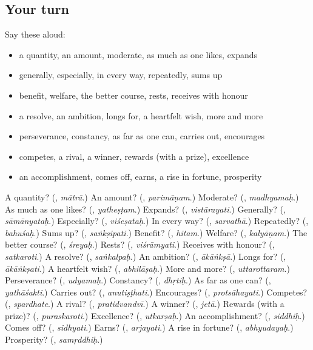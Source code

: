\subsection*{Your turn}
Say these aloud:

\begin{itemize}
\raggedright
  \item a quantity, an amount, moderate, as much as one likes, expands
  \item generally, especially, in every way, repeatedly, sums up
  \item benefit, welfare, the better course, rests, receives with honour
  \item a resolve, an ambition, longs for, a heartfelt wish, more and more
  \item perseverance, constancy, as far as one can, carries out, encourages
  \item competes, a rival, a winner, rewards (with a prize), excellence
  \item an accomplishment, comes off, earns, a rise in fortune, prosperity
\end{itemize}

\begin{tcolorbox}[breakable,colback=teal!4,colframe=teal!35!black,title={Before you move on}]
A quantity? (\textbf{}, \emph{mātrā}.) An amount? (\textbf{}, \emph{parimāṇam}.) Moderate? (\textbf{}, \emph{madhyamaḥ}.) As much as one likes? (\textbf{}, \emph{yatheṣṭam}.) Expands? (\textbf{}, \emph{vistārayati}.) Generally? (\textbf{}, \emph{sāmānyataḥ}.) Especially? (\textbf{}, \emph{viśeṣataḥ}.) In every way? (\textbf{}, \emph{sarvathā}.) Repeatedly? (\textbf{}, \emph{bahuśaḥ}.) Sums up? (\textbf{}, \emph{saṅkṣipati}.) Benefit? (\textbf{}, \emph{hitam}.) Welfare? (\textbf{}, \emph{kalyāṇam}.) The better course? (\textbf{}, \emph{śreyaḥ}.) Rests? (\textbf{}, \emph{viśrāmyati}.) Receives with honour? (\textbf{}, \emph{satkaroti}.) A resolve? (\textbf{}, \emph{saṅkalpaḥ}.) An ambition? (\textbf{}, \emph{ākāṅkṣā}.) Longs for? (\textbf{}, \emph{ākāṅkṣati}.) A heartfelt wish? (\textbf{}, \emph{abhilāṣaḥ}.) More and more? (\textbf{}, \emph{uttarottaram}.) Perseverance? (\textbf{}, \emph{udyamaḥ}.) Constancy? (\textbf{}, \emph{dhṛtiḥ}.) As far as one can? (\textbf{}, \emph{yathāśakti}.) Carries out? (\textbf{}, \emph{anutiṣṭhati}.) Encourages? (\textbf{}, \emph{protsāhayati}.) Competes? (\textbf{}, \emph{spardhate}.) A rival? (\textbf{}, \emph{pratidvandvī}.) A winner? (\textbf{}, \emph{jetā}.) Rewards (with a prize)? (\textbf{}, \emph{puraskaroti}.) Excellence? (\textbf{}, \emph{utkarṣaḥ}.) An accomplishment? (\textbf{}, \emph{siddhiḥ}.) Comes off? (\textbf{}, \emph{sidhyati}.) Earns? (\textbf{}, \emph{arjayati}.) A rise in fortune? (\textbf{}, \emph{abhyudayaḥ}.) Prosperity? (\textbf{}, \emph{samṛddhiḥ}.)
\end{tcolorbox}
